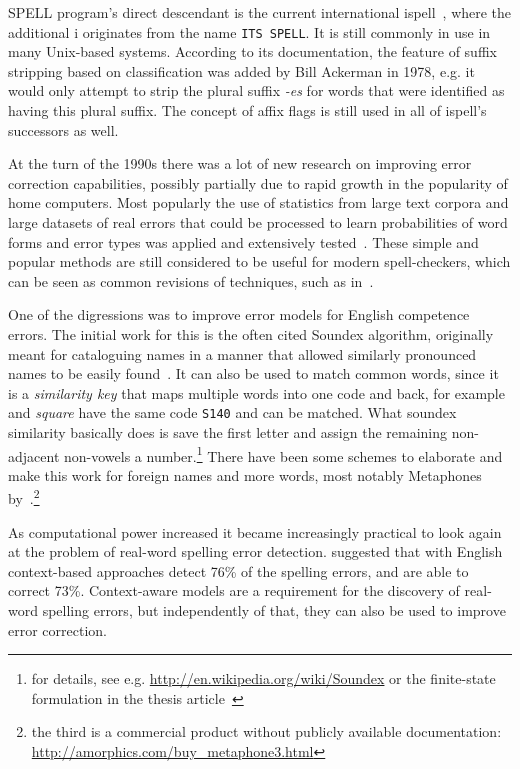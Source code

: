 \documentclass[officiallayout,final]{unihelcompling}
\newcommand\misspelt{\bgroup\markoverwith
{\textcolor{red}{\lower3.5pt\hbox{\sixly \char58}}}\ULon}
\begin{document}
SPELL program's direct descendant is the current international
ispell~\citep{gorin1971spell}, where the additional i originates from the name
\texttt{ITS SPELL}. It is still commonly in use in many Unix-based systems.
According to its documentation, the feature of suffix stripping based on
classification was added by Bill Ackerman in 1978, e.g. it would only attempt
to strip the plural suffix \emph{-es} for words that were identified as having
this plural suffix.  The concept of affix flags is still used in all of
ispell's successors as well.

At the turn of the 1990s there was a lot of new research on improving error
correction capabilities, possibly partially due to rapid growth in the
popularity of home computers. Most popularly the use of statistics from large
text corpora and large datasets of real errors that could be processed to learn
probabilities of word forms and error types was applied and extensively
tested~\citep{kernighan1990spelling,church1991probability}. These simple and
popular methods are still considered to be useful for modern spell-checkers,
which can be seen as common revisions of techniques, such as
in~\citet{brill2000improved}.

One of the digressions was to improve \glspl{error model} for English
competence errors. The initial work for this is the often cited Soundex
algorithm, originally meant for cataloguing names in a manner that allowed
similarly pronounced names to be easily found~\citep{russell1918soundex}. It
can also be used to match common words, since it is a \emph{similarity key}
that maps multiple words into one code and back, for example \misspelt{squer}
and \emph{square} have the same code \texttt{S140} and can be matched.  What
soundex similarity basically does is save the first letter and assign the
remaining non-adjacent non-vowels a number.\footnote{for details, see e.g.
\url{http://en.wikipedia.org/wiki/Soundex} or the finite-state formulation in
the thesis article~} There have been some
schemes to elaborate and make this work for foreign names and more words, most
notably Metaphones
by~\citet{philips1990hanging,philips2000double}.\footnote{the third is a
commercial product without publicly available documentation:
\url{http://amorphics.com/buy_metaphone3.html}}

As computational power increased it became increasingly practical to look
again at the problem of real-word spelling error detection.
\citet{mays1991context} suggested that with English context-based
approaches detect 76\% of the spelling errors, and are able to correct 73\%.
Context-aware models are a requirement for the discovery of real-word
spelling errors, but independently of that, they can also be used to improve
error correction. 
\end{document}
